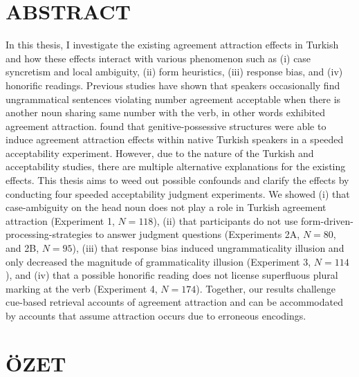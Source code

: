 \chapter*{ABSTRACT\\ \ttitle}
\setcounter{page}{4}

In this thesis, I investigate the existing agreement attraction effects in Turkish and how these effects interact with various phenomenon such as (i) case syncretism and local ambiguity, (ii) form heuristics, (iii) response bias, and (iv) honorific readings. Previous studies have shown that speakers occasionally find ungrammatical sentences violating number agreement acceptable when there is another noun sharing same number with the verb, in other words exhibited agreement attraction. \citet{LagoEtAl2019} found that genitive-possessive structures were able to induce agreement attraction effects within native Turkish speakers in a speeded acceptability experiment. However, due to the nature of the Turkish and acceptability studies, there are multiple alternative explanations for the existing effects. This thesis aims to weed out possible confounds and clarify the effects by conducting four speeded acceptability judgment experiments. We showed (i) that case-ambiguity on the head noun does not play a role in Turkish agreement attraction (Experiment 1, $N=118$), (ii) that participants do not use form-driven-processing-strategies to answer judgment questions (Experiments 2A, $N=80$, and 2B, $N=95$), (iii) that response bias induced ungrammaticality illusion and only decreased the magnitude of grammaticality illusion (Experiment 3, $N=114$), and (iv) that a possible honorific reading does not license superfluous plural marking at the verb (Experiment 4, $N=174$). Together, our results challenge cue-based retrieval accounts of agreement attraction and can be accommodated by accounts that assume attraction occurs due to erroneous encodings.

\newpage


\chapter*{\"{O}ZET\\ \ttitletr}

